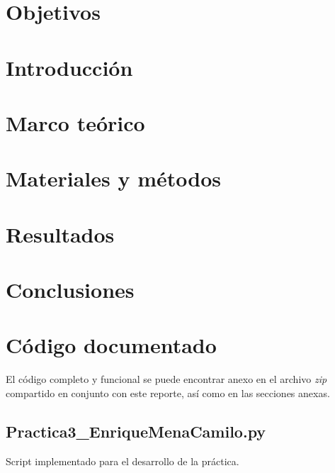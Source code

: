 \documentclass[12pt, letterpaper, spanish, twoside]{article}
\begin{document}
\renewcommand{\tablename}{Tabla}




\tableofcontents
\newpage


\section{Objetivos}


\section{Introducción}


\section{Marco teórico}


\section{Materiales y métodos}


% 

\section{Resultados}


\section{Conclusiones}


\nocite{*}
\renewcommand{\refname}{Referencias bibliográficas}



\appendix
\section{Código documentado}
El código completo y funcional se puede encontrar anexo en el archivo \emph{zip} compartido en conjunto con este reporte, así como en las secciones anexas.

\subsection{Practica3\_EnriqueMenaCamilo.py}
Script implementado para el desarrollo de la práctica.
\inputminted[linenos=true, fontsize=\scriptsize]{Python}{../Practica3_EnriqueMenaCamilo.py}
\end{document}

